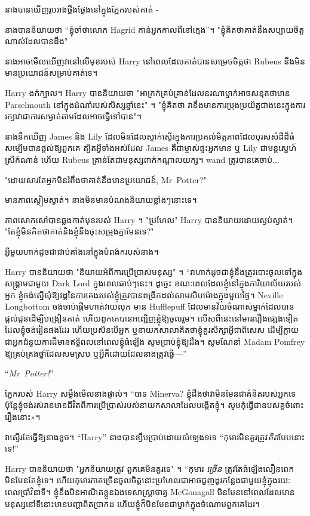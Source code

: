 {នាងបានឃើញរូបរាងថ្លឹងថ្លែងនៅក្នុងភ្នែករបស់គាត់ -

នាង​បាន​និយាយ​ថា “ខ្ញុំ​ចាំ​ថា​លោក Hagrid កាន់​អ្នក​កាល​ពី​នៅ​ក្មេង”។ "ខ្ញុំគិតថាគាត់នឹងសប្បាយចិត្តណាស់ដែលបានដឹង"

នាងអាចមើលឃើញវានៅលើមុខរបស់ Harry នៅពេលដែលគាត់បានសម្រេចចិត្តថា Rubeus នឹងមិនមានប្រយោជន៍សម្រាប់គាត់ទេ។

Harry ងក់ក្បាល។ Harry បាននិយាយថា "អាក្រក់គ្រប់គ្រាន់ដែលនរណាម្នាក់អាចសន្មតថាមាន Parselmouth នៅក្នុងដំណាំរបស់សិស្សឆ្នាំនេះ" ។ "ខ្ញុំ​គិត​ថា វា​នឹង​មាន​ការ​ប្រុង​ប្រយ័ត្ន​ជាង​នេះ​ក្នុង​ការ​រក្សា​វា​ជា​ការ​សម្ងាត់​តាម​ដែល​អាច​ធ្វើ​ទៅ​បាន"។

នាងនឹកឃើញ James និង Lily ដែលមិនដែលស្ទាក់ស្ទើរក្នុងការប្រគល់មិត្តភាពដែលបុរសសំដីដ៏ធំសម្បើមបានផ្តល់ឱ្យពួកគេ ត្បិតអ្វីទាំងអស់ដែល James គឺជាម្ចាស់ផ្ទះអ្នកមាន ឬ Lily ជាមន្តស្នេហ៍ស្រីកំណាន់ ហើយ Rubeus គ្រាន់តែជាមនុស្សពាក់កណ្តាលយក្ស។ wand ត្រូវ​បាន​គេ​ចាប់...

"ដោយសារតែអ្នកមិនរំពឹងថាគាត់នឹងមានប្រយោជន៍, Mr~Potter?"

មានភាពស្ងៀមស្ងាត់។ នាង​មិន​មាន​បំណង​និយាយ​ខ្លាំង​ៗ​នោះ​ទេ។

ភាពសោកសៅបានឆ្លងកាត់មុខរបស់ Harry ។ "ប្រហែល" Harry បាននិយាយដោយស្ងប់ស្ងាត់។ "តែខ្ញុំមិនគិតថាគាត់និងខ្ញុំនឹងចុះសម្រុងគ្នាមែនទេ?"

អ្វីមួយហាក់ដូចជាជាប់គាំងនៅក្នុងបំពង់ករបស់នាង។

Harry បាននិយាយថា "និយាយអំពីការប្រើប្រាស់មនុស្ស" ។ “វាហាក់ដូចជាខ្ញុំនឹងត្រូវបោះចូលទៅក្នុងសង្រ្គាមជាមួយ Dark Lord ក្នុងពេលឆាប់ៗនេះ។ ដូច្នេះ ខណៈពេលដែលខ្ញុំនៅក្នុងការិយាល័យរបស់អ្នក ខ្ញុំចង់ស្នើសុំឱ្យវដ្តនៃការគេងរបស់ខ្ញុំត្រូវបានពង្រីកដល់សាមសិបម៉ោងក្នុងមួយថ្ងៃ។ Neville Longbottom ចង់ចាប់ផ្តើមហាត់វាយលុក មាន Hufflepuff ដែលមានវ័យចំណាស់ម្នាក់ដែលបានផ្តល់ជូនដើម្បីបង្រៀនគាត់ ហើយពួកគេបានអញ្ជើញខ្ញុំឱ្យចូលរួម។ លើសពីនេះនៅមានរឿងផ្សេងទៀតដែលខ្ញុំចង់រៀនផងដែរ ហើយប្រសិនបើអ្នក ឬនាយកសាលាគិតថាខ្ញុំគួរសិក្សាអ្វីជាពិសេស ដើម្បីក្លាយជាអ្នកជំនួយការដ៏មានឥទ្ធិពលនៅពេលខ្ញុំធំឡើង សូមប្រាប់ខ្ញុំឱ្យដឹង។ សូមណែនាំ Madam Pomfrey ឱ្យគ្រប់គ្រងថ្នាំដែលសមស្រប ឬអ្វីក៏ដោយដែលនាងត្រូវធ្វើ—”

“\emph{Mr~Potter!}”

ភ្នែករបស់ Harry សម្លឹងមើលនាងផ្ទាល់។ “បាទ Minerva? ខ្ញុំដឹងថាវាមិនមែនជាគំនិតរបស់អ្នកទេ ប៉ុន្តែខ្ញុំចង់រស់រានមានជីវិតពីការប្រើប្រាស់របស់នាយកសាលាដែលបង្កើតខ្ញុំ។ សូម​កុំ​ធ្វើ​ជា​ឧបសគ្គ​ចំពោះ​រឿង​នោះ»។

វាស្ទើរតែធ្វើឱ្យនាងខូច។ “Harry” នាងបានខ្សឹបប្រាប់ដោយសំឡេងទទេ “កុមារមិនគួរត្រូវ\emph{គិត}បែបនោះទេ!”

Harry បាននិយាយថា "អ្នកនិយាយត្រូវ ពួកគេមិនគួរទេ" ។ “កុមារ \emph{ច្រើន} ត្រូវតែធំឡើងលឿនពេក មិនមែនតែខ្ញុំទេ។ ហើយកុមារភាគច្រើនចូលចិត្តនោះប្រហែលជាអាចជួញដូរកន្លែងជាមួយខ្ញុំក្នុងរយៈពេលប្រាំវិនាទី។ ខ្ញុំនឹងមិនអាណិតខ្លួនឯងទេសាស្រ្តាចារ្យ McGonagall មិនមែននៅពេលដែលមានមនុស្សនៅទីនោះមានបញ្ហាពិតប្រាកដ ហើយខ្ញុំក៏មិនមែនជាម្នាក់ក្នុងចំណោមពួកគេដែរ។

}
